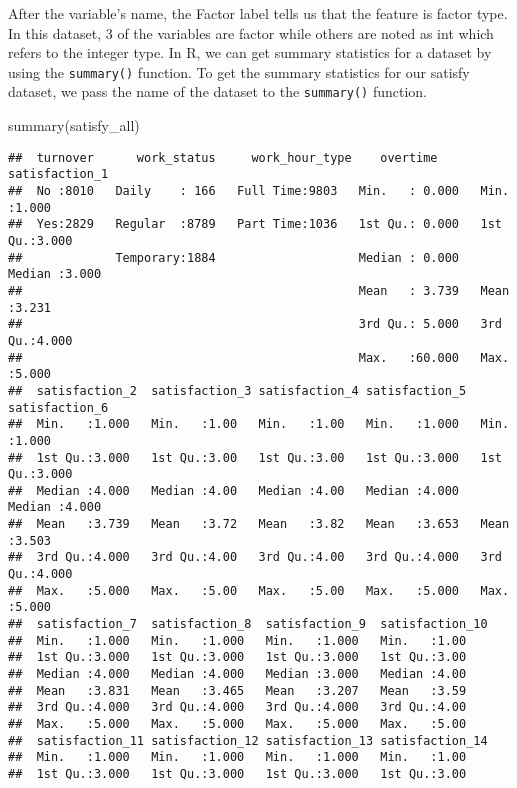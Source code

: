 \documentclass[
]{book}
\newenvironment{Shaded}{\begin{snugshade}}{\end{snugshade}}
\newcommand{\FunctionTok}[1]{\textcolor[rgb]{0.00,0.00,0.00}{#1}}
\newcommand{\NormalTok}[1]{#1}
\begin{document}
After the variable's name, the Factor label tells us that the feature is factor type. In this dataset, 3 of the variables are factor while others are noted as int which refers to the integer type.
In R, we can get summary statistics for a dataset by using the \texttt{summary()} function. To get the summary statistics for our satisfy dataset, we pass the name of the dataset to the \texttt{summary()} function.

\begin{Shaded}
\begin{Highlighting}[]
\FunctionTok{summary}\NormalTok{(satisfy\_all)}
\end{Highlighting}
\end{Shaded}

\begin{verbatim}
##  turnover      work_status     work_hour_type    overtime      satisfaction_1 
##  No :8010   Daily    : 166   Full Time:9803   Min.   : 0.000   Min.   :1.000  
##  Yes:2829   Regular  :8789   Part Time:1036   1st Qu.: 0.000   1st Qu.:3.000  
##             Temporary:1884                    Median : 0.000   Median :3.000  
##                                               Mean   : 3.739   Mean   :3.231  
##                                               3rd Qu.: 5.000   3rd Qu.:4.000  
##                                               Max.   :60.000   Max.   :5.000  
##  satisfaction_2  satisfaction_3 satisfaction_4 satisfaction_5  satisfaction_6 
##  Min.   :1.000   Min.   :1.00   Min.   :1.00   Min.   :1.000   Min.   :1.000  
##  1st Qu.:3.000   1st Qu.:3.00   1st Qu.:3.00   1st Qu.:3.000   1st Qu.:3.000  
##  Median :4.000   Median :4.00   Median :4.00   Median :4.000   Median :4.000  
##  Mean   :3.739   Mean   :3.72   Mean   :3.82   Mean   :3.653   Mean   :3.503  
##  3rd Qu.:4.000   3rd Qu.:4.00   3rd Qu.:4.00   3rd Qu.:4.000   3rd Qu.:4.000  
##  Max.   :5.000   Max.   :5.00   Max.   :5.00   Max.   :5.000   Max.   :5.000  
##  satisfaction_7  satisfaction_8  satisfaction_9  satisfaction_10
##  Min.   :1.000   Min.   :1.000   Min.   :1.000   Min.   :1.00   
##  1st Qu.:3.000   1st Qu.:3.000   1st Qu.:3.000   1st Qu.:3.00   
##  Median :4.000   Median :4.000   Median :3.000   Median :4.00   
##  Mean   :3.831   Mean   :3.465   Mean   :3.207   Mean   :3.59   
##  3rd Qu.:4.000   3rd Qu.:4.000   3rd Qu.:4.000   3rd Qu.:4.00   
##  Max.   :5.000   Max.   :5.000   Max.   :5.000   Max.   :5.00   
##  satisfaction_11 satisfaction_12 satisfaction_13 satisfaction_14
##  Min.   :1.000   Min.   :1.000   Min.   :1.000   Min.   :1.00   
##  1st Qu.:3.000   1st Qu.:3.000   1st Qu.:3.000   1st Qu.:3.00   

\end{verbatim}
\end{document}
